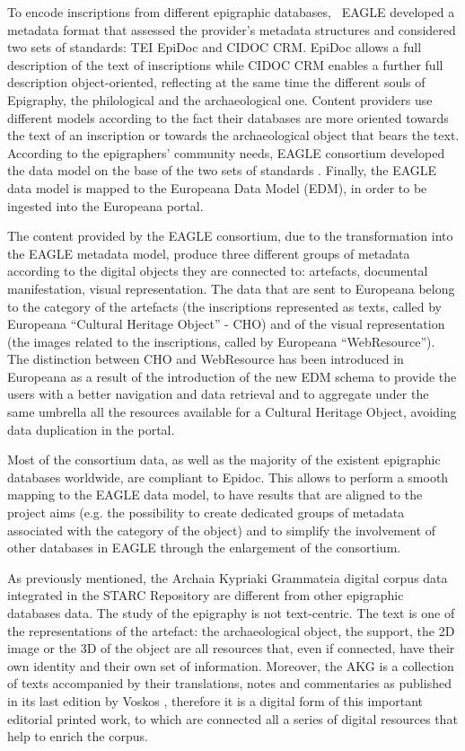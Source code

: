 \documentclass[amsthm,ebook]{saparticle}
\begin{document}
To encode inscriptions from different epigraphic databases, \ EAGLE developed a metadata format that assessed the
provider’s metadata structures and considered two sets of standards: TEI EpiDoc and CIDOC CRM. EpiDoc allows a full
description of the text of inscriptions while CIDOC CRM enables a further full description object-oriented,
reflecting at the same time the different souls of Epigraphy, the philological and the archaeological one. Content
providers use different models according to the fact their databases are more oriented towards the text of an
inscription or towards the archaeological object that bears the text. According to the epigraphers’ community needs,
EAGLE consortium developed the data model on the base of the two sets of standards \citep{liuzzo_networking_2014}. Finally, the
EAGLE data model is mapped to the Europeana Data Model (EDM), in order to be ingested into the Europeana portal.

The content provided by the EAGLE consortium, due to the transformation into the EAGLE metadata model, produce three
different groups of metadata according to the digital objects they are connected to: artefacts, documental
manifestation, visual representation. The data that are sent to Europeana belong to the category of the artefacts (the
inscriptions represented as texts, called by Europeana ``Cultural Heritage Object'' - CHO) and of the visual
representation (the images related to the inscriptions, called by Europeana ``WebResource''). The distinction between CHO
and WebResource has been introduced in Europeana as a result of the introduction of the new EDM schema to provide the
users with a better navigation and data retrieval and to aggregate under the same umbrella all the resources available
for a Cultural Heritage Object, avoiding data duplication in the portal.

Most of the consortium data, as well as the majority of the existent epigraphic databases worldwide, are compliant to
Epidoc. This allows to perform a smooth mapping to the EAGLE data model, to have results that are aligned to the
project aims (e.g. the possibility to create dedicated groups of metadata associated with the category of the object)
and to simplify the involvement of other databases in EAGLE through the enlargement of the consortium.

As previously mentioned, the Archaia Kypriaki Grammateia digital corpus data integrated in the STARC Repository are
different from other epigraphic databases data. The study of the epigraphy is not text-centric. The text is one of the
representations of the artefact: the archaeological object, the support, the 2D image or the 3D of the object are all
resources that, even if connected, have their own identity and their own set of information. Moreover, the AKG is a
collection of texts accompanied by their translations, notes and commentaries as published in its last edition by
Voskos \citep{voskos__1997}, therefore it is a digital form of this important editorial printed work, to which are connected
all a series of digital resources that help to enrich the corpus.
\end{document}
